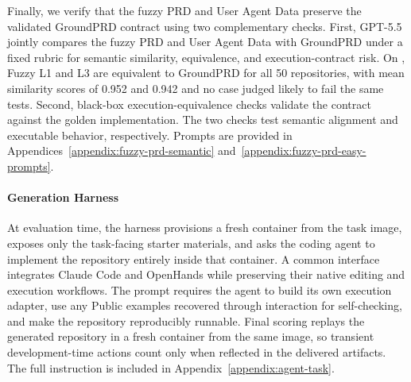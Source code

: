Finally, we verify that the fuzzy PRD and User Agent Data preserve the validated GroundPRD contract using two complementary checks. First, GPT-5.5 jointly compares the fuzzy PRD and User Agent Data with GroundPRD under a fixed rubric for semantic similarity, equivalence, and execution-contract risk. On \rcblite{}, Fuzzy L1 and L3 are equivalent to GroundPRD for all 50 repositories, with mean similarity scores of 0.952 and 0.942 and no case judged likely to fail the same tests. Second, black-box execution-equivalence checks validate the contract against the golden implementation. The two checks test semantic alignment and executable behavior, respectively. Prompts are provided in Appendices~\ref{appendix:fuzzy-prd-semantic} and~\ref{appendix:fuzzy-prd-easy-prompts}.

\paragraph{Generation Harness}
At evaluation time, the harness provisions a fresh container from the task image, exposes only the task-facing starter materials, and asks the coding agent to implement the repository entirely inside that container. A common interface integrates Claude Code and OpenHands while preserving their native editing and execution workflows. The prompt requires the agent to build its own execution adapter, use any Public examples recovered through interaction for self-checking, and make the repository reproducibly runnable. Final scoring replays the generated repository in a fresh container from the same image, so transient development-time actions count only when reflected in the delivered artifacts. The full instruction is included in Appendix~\ref{appendix:agent-task}.

